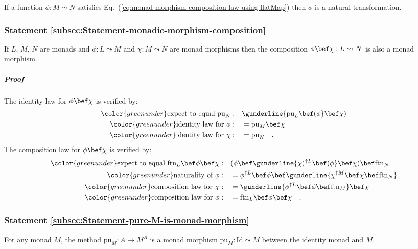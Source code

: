If a function $\phi:M\leadsto N$ satisfies Eq.~(\ref{eq:monad-morphism-composition-law-using-flatMap})
then $\phi$ is a natural transformation.

\subsubsection{Statement \label{subsec:Statement-monadic-morphism-composition}\ref{subsec:Statement-monadic-morphism-composition}}

If $L$, $M$, $N$ are monads and $\phi:L\leadsto M$ and $\chi:M\leadsto N$
are monad morphisms then the composition $\phi\bef\chi:L\leadsto N$
is also a monad morphism.

\subparagraph{Proof}

The identity law for $\phi\bef\chi$ is verified by:
\begin{align*}
{\color{greenunder}\text{expect to equal }\text{pu}_{N}:}\quad & \gunderline{\text{pu}_{L}\bef(\phi}\bef\chi)\\
{\color{greenunder}\text{identity law for }\phi:}\quad & =\text{pu}_{M}\bef\chi\\
{\color{greenunder}\text{identity law for }\chi:}\quad & =\text{pu}_{N}\quad.
\end{align*}
The composition law for $\phi\bef\chi$ is verified by:
\begin{align*}
{\color{greenunder}\text{expect to equal }\text{ftn}_{L}\bef\phi\bef\chi:}\quad & (\phi\bef\gunderline{\chi)^{\uparrow L}\bef(\phi}\bef\chi)\bef\text{ftn}_{N}\\
{\color{greenunder}\text{naturality of }\phi:}\quad & =\phi^{\uparrow L}\bef\phi\bef\gunderline{\chi^{\uparrow M}\bef\chi\bef\text{ftn}_{N}}\\
{\color{greenunder}\text{composition law for }\chi:}\quad & =\gunderline{\phi^{\uparrow L}\bef\phi\bef\text{ftn}_{M}}\bef\chi\\
{\color{greenunder}\text{composition law for }\phi:}\quad & =\text{ftn}_{L}\bef\phi\bef\chi\quad.
\end{align*}


\subsubsection{Statement \label{subsec:Statement-pure-M-is-monad-morphism}\ref{subsec:Statement-pure-M-is-monad-morphism}}

For any monad $M$, the method $\text{pu}_{M}:A\rightarrow M^{A}$
is a monad morphism $\text{pu}_{M}:\text{Id}\leadsto M$ between the
identity monad and $M$.

